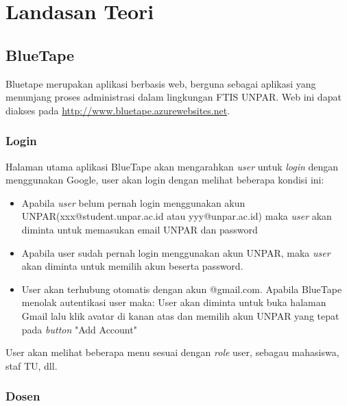 \chapter{Landasan Teori}
\label{chap:teori}

\section{BlueTape}
\label{sec:bluetape}
Bluetape merupakan aplikasi berbasis web, berguna sebagai aplikasi yang menunjang proses administrasi dalam lingkungan FTIS UNPAR. Web ini dapat diakses pada \url{http://www.bluetape.azurewebsites.net}. \cite{blueTape}

\subsection{Login}
Halaman utama aplikasi BlueTape akan mengarahkan \textit{user} untuk \textit{login} dengan menggunakan Google, user akan login dengan melihat beberapa kondisi ini:
\begin{itemize}
\item Apabila \textit{user} belum pernah login menggunakan akun UNPAR(xxx@student.unpar.ac.id atau yyy@unpar.ac.id) maka  \textit{user} akan diminta untuk memasukan email UNPAR dan password
\item Apabila user sudah pernah login menggunakan akun UNPAR, maka \textit{user} akan diminta untuk memilih akun beserta password.
\item User akan terhubung otomatis dengan akun @gmail.com. Apabila BlueTape menolak autentikasi user maka: User akan diminta untuk buka halaman Gmail lalu klik avatar di kanan atas dan memilih akun UNPAR yang tepat pada \textit{button} "Add Account"
\end{itemize}
User akan melihat beberapa menu sesuai dengan \textit{role} user, sebagau mahasiswa, staf TU, dll.

\subsection{Dosen}
